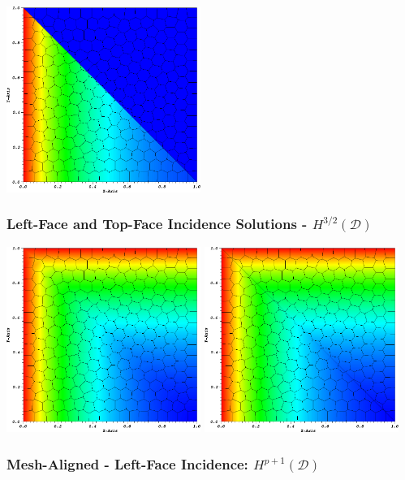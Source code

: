 \documentclass[compress,10pt]{beamer}
\begin{document}
\begin{frame}[t]
{{}\includegraphics[width=0.475\textwidth]{images/PALeftSol_SplitPoly.png}
}
{
\frametitle{Left-Face and Top-Face Incidence Solutions -  $H^{3/2} (\mathcal{D})$}
\vspace{0.75cm}
\hspace*{0.25cm}
{}\includegraphics[width=0.475\textwidth]{images/PALeftTopSol_Poly.png} 
{}\includegraphics[width=0.475\textwidth]{images/PALeftTopSol_SplitPoly.png}
}
{
\frametitle{Mesh-Aligned - Left-Face Incidence: $H^{p+1} (\mathcal{D})$}
\vspace{1.00cm}
\begin{columns}[c]
\centering

\end{columns}}
\end{frame}
\end{document}
